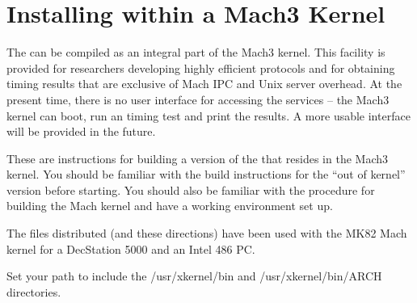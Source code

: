 %
%
%

\section{Installing within a Mach3 Kernel}
\label{installingmachk}

The \xk{} can be compiled as an integral part of the Mach3 kernel.
This facility is provided for researchers developing highly efficient
protocols and for obtaining timing results that are exclusive of
Mach IPC and Unix server overhead.  At the present time, there is no
user interface for accessing the \xk{} services -- the Mach3 kernel
can boot, run an \xk{} timing test and print the results.  A more
usable interface will be provided in the future.

These are instructions for building a version of the \xk{} that resides
in the Mach3 kernel.  You should be familiar with the build instructions
for the ``out of kernel'' version before starting.  You should also be
familiar with the procedure for building the Mach kernel and have a
working environment set up.

The files distributed (and these directions) have been used with the
MK82 Mach kernel for a DecStation 5000 and an Intel 486 PC.


Set your path to include the /usr/xkernel/bin and /usr/xkernel/bin/ARCH
directories.


